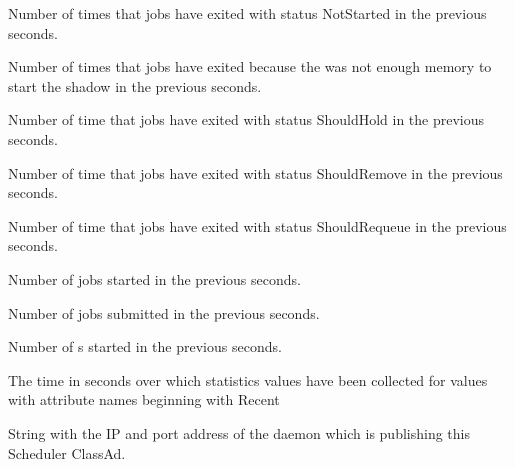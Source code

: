 \begin{description}
\item[\AdAttr{RecentJobsNotStarted}:] Number of times that jobs have exited with status NotStarted
  in the previous  seconds.

\item[\AdAttr{RecentJobsShadowNoMemory}:] Number of times that jobs have exited because the was not enough memory to start the shadow
  in the previous  seconds.

\item[\AdAttr{RecentJobsShouldHold}:] Number of time that jobs have exited with status ShouldHold
  in the previous  seconds.

\item[\AdAttr{RecentJobsShouldRemove}:] Number of time that jobs have exited with status ShouldRemove
  in the previous  seconds.

\item[\AdAttr{RecentJobsShouldRequeue}:] Number of time that jobs have exited with status ShouldRequeue
  in the previous  seconds.

\item[\AdAttr{RecentJobsStarted}:] Number of jobs started
  in the previous  seconds.

\item[\AdAttr{RecentJobsSubmitted}:] Number of jobs submitted
  in the previous  seconds.

\item[\AdAttr{RecentShadowsStarted}:] Number of s started
  in the previous  seconds.

\item[\AdAttr{RecentStatsLifetime}:] The time in seconds over which statistics values have been collected 
  for values with attribute names beginning with Recent

\item[\AdAttr{ScheddIpAddr}:] String with the IP and port address of the
 daemon which is publishing this Scheduler ClassAd.


\end{description}
